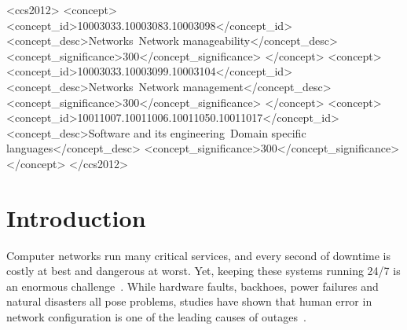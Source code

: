 \documentclass[numbers, 10pt]{sigplanconf}
\begin{document}
%
%
%
%

\begin{CCSXML}
<ccs2012>
<concept>
<concept_id>10003033.10003083.10003098</concept_id>
<concept_desc>Networks~Network manageability</concept_desc>
<concept_significance>300</concept_significance>
</concept>
<concept>
<concept_id>10003033.10003099.10003104</concept_id>
<concept_desc>Networks~Network management</concept_desc>
<concept_significance>300</concept_significance>
</concept>
<concept>
<concept_id>10011007.10011006.10011050.10011017</concept_id>
<concept_desc>Software and its engineering~Domain specific languages</concept_desc>
<concept_significance>300</concept_significance>
</concept>
</ccs2012>
\end{CCSXML}
%





%
%
%
%

\section{Introduction} \label{sec:introduction}




Computer networks run many critical services, and every second of downtime is
costly at best and dangerous at worst.  Yet, keeping these systems
running 24/7 is an enormous
challenge~\cite{mahajan+:bgp-misconfiguration,feamster+:rcc,batfish,dc-failure-study}.
%
While hardware faults, backhoes, power failures and natural disasters all pose
problems, studies have shown that human error in network
configuration is one of the leading causes of
outages~\cite{juniper-study,yankee-study}.
\end{document}

